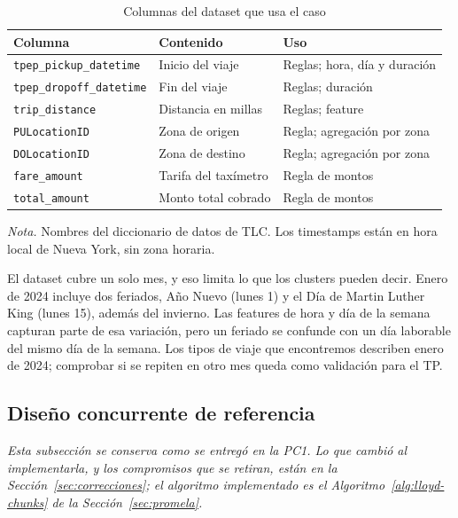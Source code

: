 \begin{table}[H]
\caption{Columnas del dataset que usa el caso}\label{tab:columnas}
\small
\begin{tabularx}{\textwidth}{@{}L{4.6cm}YL{4.2cm}@{}}
\toprule
\textbf{Columna} & \textbf{Contenido} & \textbf{Uso} \\
\midrule
\texttt{tpep\_pickup\_datetime}  & Inicio del viaje      & Reglas; hora, día y duración \\
\texttt{tpep\_dropoff\_datetime} & Fin del viaje         & Reglas; duración \\
\texttt{trip\_distance}          & Distancia en millas   & Reglas; feature \\
\texttt{PULocationID}            & Zona de origen        & Regla; agregación por zona \\
\texttt{DOLocationID}            & Zona de destino       & Regla; agregación por zona \\
\texttt{fare\_amount}            & Tarifa del taxímetro  & Regla de montos \\
\texttt{total\_amount}           & Monto total cobrado   & Regla de montos \\
\bottomrule
\end{tabularx}

{\footnotesize\textit{Nota.} Nombres del diccionario de datos de TLC. Los timestamps están en hora
local de Nueva York, sin zona horaria.}
\end{table}

El dataset cubre un solo mes, y eso limita lo que los clusters pueden decir. Enero de 2024 incluye
dos feriados, Año Nuevo (lunes 1) y el Día de Martin Luther King (lunes 15), además del invierno.
Las features de hora y día de la semana capturan parte de esa variación, pero un feriado se confunde
con un día laborable del mismo día de la semana. Los tipos de viaje que encontremos describen enero
de 2024; comprobar si se repiten en otro mes queda como validación para el TP.

\subsection{Diseño concurrente de referencia}\label{sec:diseno}

\emph{Esta subsección se conserva como se entregó en la PC1. Lo que cambió al implementarla, y los
compromisos que se retiran, están en la Sección~\ref{sec:correcciones}; el algoritmo implementado es
el Algoritmo~\ref{alg:lloyd-chunks} de la Sección~\ref{sec:promela}.}

